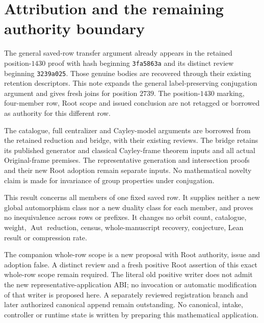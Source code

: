 \documentclass[11pt]{article}
\begin{document}
\section*{Attribution and the remaining authority boundary}

The general saved-row transfer argument already appears in the retained
position-$1430$ proof with hash beginning \texttt{3fa5863a} and its
distinct review beginning \texttt{3239a025}.  Those genuine bodies are
recovered through their existing retention descriptors.  This note
expands the general label-preserving conjugation argument and gives
fresh joins for position $2739$.  The position-$1430$ marking, four-member
row, Root scope and issued conclusion are not retagged or borrowed as
authority for this different row.

The catalogue, full centralizer and Cayley-model arguments are borrowed
from the retained reduction and bridge, with their existing reviews.
The bridge retains its published generator and classical Cayley-frame
theorem inputs and all actual Original-frame premises.  The representative
generation and intersection proofs and their new Root adoption remain
separate inputs.  No mathematical novelty claim is made for invariance
of group properties under conjugation.

This result concerns all members of one fixed saved row.  It supplies
neither a new global automorphism class nor a new duality class for each
member, and proves no inequivalence across rows or prefixes.  It changes
no orbit count, catalogue, weight, $\operatorname{Aut}$ reduction, census,
whole-manuscript recovery, conjecture, Lean result or compression rate.

The companion whole-row scope is a new proposal with Root authority,
issue and adoption false.  A distinct review and a fresh positive Root
assertion of this exact whole-row scope remain required.  The literal
old positive writer does not admit the new representative-application
ABI; no invocation or automatic modification of that writer is proposed
here.  A separately reviewed registration branch and later authorized
canonical append remain outstanding.  No canonical, intake, controller
or runtime state is written by preparing this mathematical application.
\end{document}
